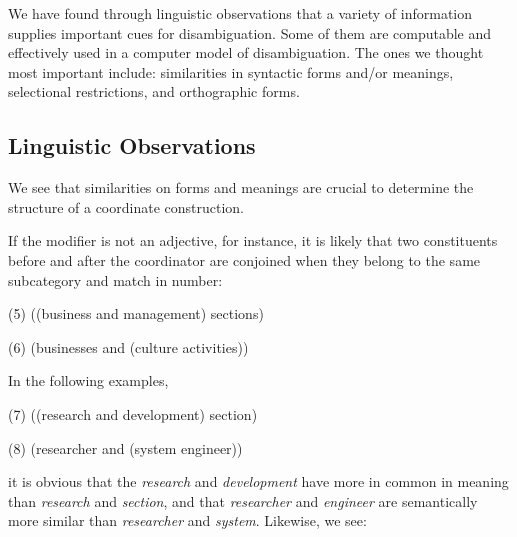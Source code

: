 We have found through linguistic observations that a variety of
information supplies important cues for disambiguation.  Some of them
are computable and effectively used in a computer model of
disambiguation. The ones we thought most important include:
similarities  in syntactic forms and/or meanings, selectional restrictions,  and
orthographic forms.

\subsection{Linguistic Observations}


\hspace*{-5mm}{\bf Similarities in Syntactic Forms and Meanings}   \hspace*{4mm}We see
that similarities on forms and meanings are crucial to determine the
structure of a coordinate construction.

     If the modifier is not an adjective, for instance, it is likely
that two constituents before and after the coordinator are conjoined 
when they belong to the same subcategory and match in number: 

\vspace*{4mm}

 \hspace*{5mm} (5) ((business and management) sections)


 \hspace*{5mm} (6) (businesses and (culture activities))


\vspace*{4mm}

In the  following examples, 

\vspace*{4mm}
 \hspace*{5mm} (7) ((research and development) section)



 \hspace*{5mm} (8) (researcher and (system engineer))

\vspace*{4mm}
\hspace*{-5mm}it is obvious that the {\it research} and {\it development} have more
in common in meaning than {\it research} and {\it section}, and that
{\it researcher} and  {\it engineer} are semantically
more similar than {\it researcher} and {\it system}.  Likewise, we see:


\vspace*{3mm}

